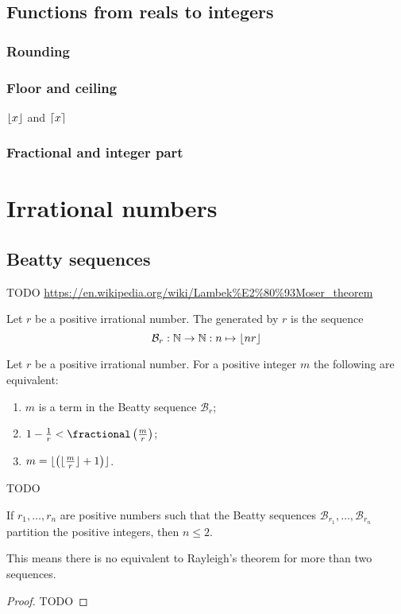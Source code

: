 \subsection{Functions from reals to integers}
\subsubsection{Rounding}
\subsubsection{Floor and ceiling}
$\lfloor x\rfloor$ and $\lceil x\rceil$
\subsubsection{Fractional and integer part}

\section{Irrational numbers}
\subsection{Beatty sequences}
TODO \url{https://en.wikipedia.org/wiki/Lambek%E2%80%93Moser_theorem}
\begin{definition}
Let $r$ be a positive irrational number. The  generated by $r$ is the sequence
\[ \mathcal{B}_r: \mathbb{N} \to \mathbb{N}: n\mapsto \lfloor nr\rfloor  \]
\end{definition}

\begin{lemma}
Let $r$ be a positive irrational number. For a positive integer $m$ the following are equivalent:
\begin{enumerate}
\item $m$ is a term in the Beatty sequence $\mathcal{B}_r$;
\item $1 - \frac{1}{r} < \fractional\left(\frac{m}{r}\right)$;
\item $m = \lfloor\left(\lfloor\frac{m}{r}\rfloor+1\right)\rfloor$.
\end{enumerate}
\end{lemma}

\begin{theorem}[Rayleigh]
TODO
\end{theorem}

\begin{theorem}[Uspensky]
If $r_1, \ldots, r_n$ are positive numbers such that the Beatty sequences $\mathcal{B}_{r_1}, \ldots, \mathcal{B}_{r_n}$ partition the positive integers, then $n\leq 2$.
\end{theorem}
This means there is no equivalent to Rayleigh's theorem for more than two sequences.
\begin{proof}
TODO
\end{proof}

